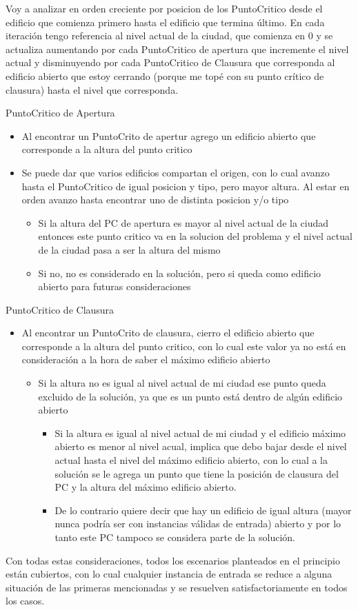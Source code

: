 Voy a analizar en orden creciente por posicion de los PuntoCritico desde el edificio que comienza primero hasta el edificio que termina último.
En cada iteración tengo referencia al nivel actual de la ciudad, que comienza en 0 y se actualiza aumentando por cada PuntoCritico de apertura que incremente el nivel actual y disminuyendo por cada PuntoCritico de Clausura que corresponda al edificio abierto que estoy cerrando (porque me topé con su punto crítico de clausura) hasta el nivel que corresponda.

PuntoCritico de Apertura
\begin{itemize}
		\item Al encontrar un PuntoCrito de apertur agrego un edificio abierto que corresponde a la altura del punto critico
		\item Se puede dar que varios edificios compartan el origen, con lo cual avanzo hasta el PuntoCritico de igual posicion y tipo, pero mayor altura. Al estar en orden avanzo hasta encontrar uno de distinta posicion y/o tipo
		\begin{itemize}
		\item Si la altura del PC de apertura es mayor al nivel actual de la ciudad entonces este punto critico va en la solucion del problema y el nivel actual de la ciudad pasa a ser la altura del mismo
		\item Si no, no es considerado en la solución, pero si queda como edificio abierto para futuras consideraciones
		\end{itemize}
\end{itemize}

PuntoCritico de Clausura
\begin{itemize}
		\item Al encontrar un PuntoCrito de clausura, cierro el edificio abierto que corresponde a la altura del punto critico, con lo cual este valor ya no está en consideración a la hora de saber el máximo edificio abierto
		\begin{itemize}
		\item Si la altura no es igual al nivel actual de mi ciudad ese punto queda excluido de la solución, ya que es un punto está dentro de algún edificio abierto
			\begin{itemize}
			\item Si la altura es igual al nivel actual de mi ciudad y el edificio máximo abierto es menor al nivel acual, implica que debo bajar desde el nivel actual hasta el nivel del máximo edificio abierto, con lo cual a la solución se le agrega un punto que tiene la posición de clausura del PC y la altura del máximo edificio abierto.
			\item De lo contrario quiere decir que hay un edificio de igual altura (mayor nunca podría ser con instancias válidas de entrada) abierto y por lo tanto este PC tampoco se considera parte de la solución.
			\end{itemize}
		\end{itemize}
\end{itemize}

Con todas estas consideraciones, todos los escenarios planteados en el principio están cubiertos, con lo cual cualquier instancia de entrada se reduce a alguna situación de las primeras mencionadas y se resuelven satisfactoriamente en todos los casos.
